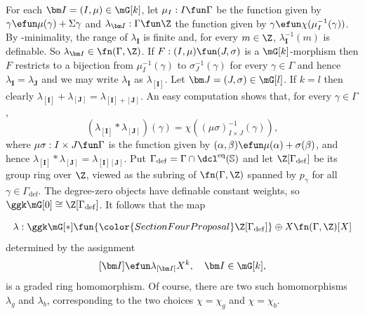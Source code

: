 \begin{rem}\label{int:Gam}
For each $\bm I = (I, \mu) \in \mG[k]$, let $\mu_I : I \fun \Gamma$ be the function given by $\gamma \efun \mu(\gamma) + \Sigma\gamma$ and $\lambda_{\bm I} : \Gamma \fun \Z$  the function given by $\gamma \efun \chi(\mu^{-1}_I(\gamma))$. By \omin-minimality, the range of $\lambda_{\bm I}$ is finite and, for every $m \in \Z$, $\lambda_{\bm I}^{-1}(m)$ is definable. So $\lambda_{\bm I} \in \fn(\Gamma, \Z)$. If $F :(I, \mu) \fun (J, \sigma)$ is a $\mG[k]$-morphism then $F$ restricts to a bijection from $\mu^{-1}_I(\gamma)$ to $\sigma_J^{-1}(\gamma)$ for every $\gamma \in \Gamma$ and hence $\lambda_{\bm I} = \lambda_{\bm J}$ and we may write $\lambda_{\bm I}$ as $\lambda_{[\bm I]}$. Let $\bm J = (J, \sigma) \in \mG[l]$. If $k=l$ then clearly $\lambda_{[\bm I]} + \lambda_{[\bm J]} = \lambda_{[\bm I]+[\bm J]}$. An easy computation shows that, for every $\gamma \in \Gamma$,
\[
(\lambda_{[\bm I]} * \lambda_{[\bm J]})(\gamma) = \chi( (\mu \sigma)^{-1}_{I \times J}(\gamma)),
\]
where $\mu \sigma : I \times J \fun \Gamma$ is the function given by $(\alpha, \beta) \efun \mu(\alpha) + \sigma(\beta)$, and hence $\lambda_{[\bm I]} * \lambda_{[\bm J]} = \lambda_{[\bm I][\bm J]}$. {\color{SectionFourProposal}Put $\Gamma_{\mathrm{def}}=\Gamma\cap\dcl^{\mathrm{eq}}(\mathbb S)$ and let $\Z[\Gamma_{\mathrm{def}}]$ be its group ring over $\Z$, viewed as the subring of $\fn(\Gamma,\Z)$ spanned by $p_\gamma$ for all $\gamma\in\Gamma_{\mathrm{def}}$. The degree-zero objects have definable constant weights, so $\ggk\mG[0]\cong\Z[\Gamma_{\mathrm{def}}]$.} It follows that the map

\[
\lambda : \ggk \mG[*] \fun {\color{SectionFourProposal}\Z[\Gamma_{\mathrm{def}}]} \oplus X \fn(\Gamma, \Z)[X]
\]
determined by the assignment
\[
[\bm I] \efun \lambda_{[\bm I]}X^k, \quad \bm I \in \mG[k],
\]
is a graded ring homomorphism. Of course, there are two such homomorphisms $\lambda_g$ and $\lambda_b$, corresponding to the two choices $\chi = \chi_{g}$ and $\chi = \chi_{b}$.
\end{rem}


